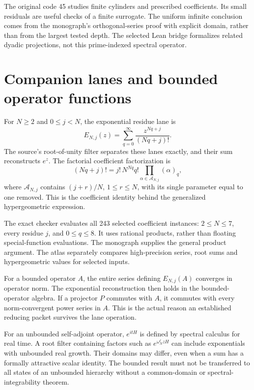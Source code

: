 The original code 45 studies finite cylinders and prescribed coefficients. Its small residuals are useful checks of a finite surrogate. The uniform infinite conclusion comes from the monograph's orthogonal-series proof with explicit domain, rather than from the largest tested depth. The selected Lean bridge formalizes related dyadic projections, not this prime-indexed spectral operator.

\clearpage
\section{Companion lanes and bounded operator functions}\label{a-verify-lanes}

For \(N\ge2\) and \(0\le j<N\), the exponential residue lane is
\[
 E_{N,j}(z)=\sum_{q=0}^{\infty}
 \frac{z^{Nq+j}}{(Nq+j)!}.
\]
The source's root-of-unity filter separates these lanes exactly, and their sum reconstructs \(e^z\). The factorial coefficient factorization is
\[
 (Nq+j)!=j!\,N^{Nq}q!
 \prod_{\alpha\in\mathcal A_{N,j}}(\alpha)_q,
\]
where \(\mathcal A_{N,j}\) contains \((j+r)/N\), \(1\le r\le N\), with its single parameter equal to one removed. This is the coefficient identity behind the generalized hypergeometric expression.

The exact checker evaluates all 243 selected coefficient instances: \(2\le N\le7\), every residue \(j\), and \(0\le q\le8\). It uses rational products, rather than floating special-function evaluations. The monograph supplies the general product argument. The atlas separately compares high-precision series, root sums and hypergeometric values for selected inputs.

For a bounded operator \(A\), the entire series defining \(E_{N,j}(A)\) converges in operator norm. The exponential reconstruction then holds in the bounded-operator algebra. If a projector \(P\) commutes with \(A\), it commutes with every norm-convergent power series in \(A\). This is the actual reason an established reducing packet survives the lane operation.

For an unbounded self-adjoint operator, \(e^{itH}\) is defined by spectral calculus for real time. A root filter containing factors such as \(e^{\omega_N^\ell zH}\) can include exponentials with unbounded real growth. Their domains may differ, even when a sum has a formally attractive scalar identity. The bounded result must not be transferred to all states of an unbounded hierarchy without a common-domain or spectral-integrability theorem.


